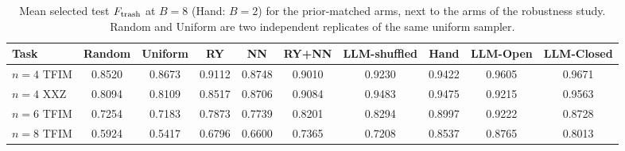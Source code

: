 \documentclass[11pt]{article}
\begin{document}
\begin{table}[t]
\centering\small
\caption{Mean selected test $F_{\rm trash}$ at $B=8$ (Hand: $B=2$) for the
prior-matched arms, next to the arms of the robustness study. Random and Uniform are
two independent replicates of the same uniform sampler.}
\label{tab:prior-means}
\footnotesize\setlength{\tabcolsep}{3.5pt}
\begin{tabular}{lccccccccc}
\toprule
Task & Random & Uniform & RY & NN & RY+NN & LLM-shuffled & Hand & LLM-Open & LLM-Closed\\
\midrule
$n{=}4$ TFIM & 0.8520 & 0.8673 & 0.9112 & 0.8748 & 0.9010 & 0.9230 & 0.9422 & 0.9605 & 0.9671 \\
$n{=}4$ XXZ & 0.8094 & 0.8109 & 0.8517 & 0.8706 & 0.9084 & 0.9483 & 0.9475 & 0.9215 & 0.9563 \\
$n{=}6$ TFIM & 0.7254 & 0.7183 & 0.7873 & 0.7739 & 0.8201 & 0.8294 & 0.8997 & 0.9222 & 0.8728 \\
$n{=}8$ TFIM & 0.5924 & 0.5417 & 0.6796 & 0.6600 & 0.7365 & 0.7208 & 0.8537 & 0.8765 & 0.8013 \\
\bottomrule
\end{tabular}
\end{table}
\end{document}
